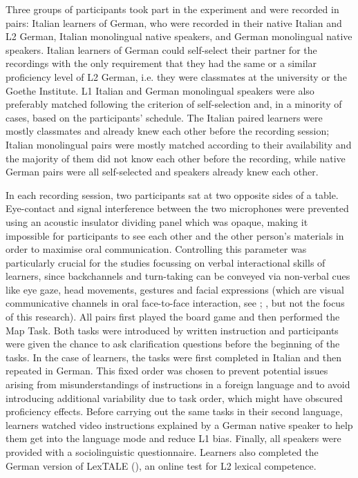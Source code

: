 Three groups of participants took part in the experiment and were recorded in pairs: Italian learners of German, who were recorded in their native Italian and L2 German, Italian monolingual native speakers, and German monolingual native speakers. Italian learners of German could self-select their partner for the recordings with the only requirement that they had the same or a similar proficiency level of L2 German, i.e. they were classmates at the university or the Goethe Institute. L1 Italian and German monolingual speakers were also preferably matched following the criterion of self-selection and, in a minority of cases, based on the participants’ schedule. The Italian paired learners were mostly classmates and already knew each other before the recording session; Italian monolingual pairs were mostly matched according to their availability and the majority of them did not know each other before the recording, while native German pairs were all self-selected and speakers already knew each other.

In each recording session, two participants sat at two opposite sides of a table. Eye-contact and signal interference between the two microphones were prevented using an acoustic insulator dividing panel which was opaque, making it impossible for participants to see each other and the other person’s materials in order to maximise oral communication. Controlling this parameter was particularly crucial for the studies focussing on verbal interactional skills of learners, since backchannels and turn-taking can be conveyed via non-verbal cues like eye gaze, head movements, gestures and facial expressions (which are visual communicative channels in oral face-to-face interaction, see \citealt{KimEtAl2024}; \citealt{McDonoughEtAl2024}, but not the focus of this research). All pairs first played the board game and then performed the Map Task. Both tasks were introduced by written instruction and participants were given the chance to ask clarification questions before the beginning of the tasks. In the case of learners, the tasks were first completed in Italian and then repeated in German. This fixed order was chosen to prevent potential issues arising from misunderstandings of instructions in a foreign language and to avoid introducing additional variability due to task order, which might have obscured proficiency effects. Before carrying out the same tasks in their second language, learners watched video instructions explained by a German native speaker to help them get into the language mode and reduce L1 bias. Finally, all speakers were provided with a sociolinguistic questionnaire. Learners also completed the German version of LexTALE (\citealt{LemhöferBroersma2012}), an online test for L2 lexical competence.

